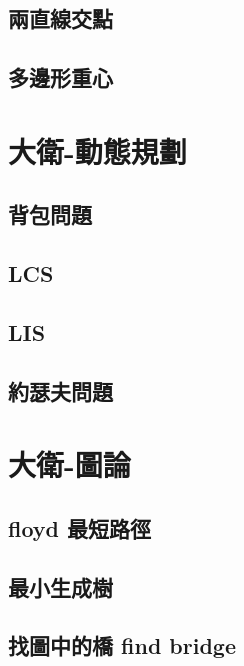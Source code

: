 \subsection{兩直線交點}
\raggedbottom
\hrulefill
\subsection{多邊形重心}
\raggedbottom
\hrulefill

\section{大衛-動態規劃}
\subsection{背包問題}
\raggedbottom
\hrulefill
\subsection{LCS}
\raggedbottom
\hrulefill
\subsection{LIS}
\raggedbottom
\hrulefill
\subsection{約瑟夫問題}
\raggedbottom
\hrulefill

\section{大衛-圖論}
\subsection{floyd 最短路徑}
\raggedbottom
\hrulefill
\subsection{最小生成樹}
\raggedbottom
\hrulefill
\subsection{找圖中的橋 find bridge}
\raggedbottom
\hrulefill
